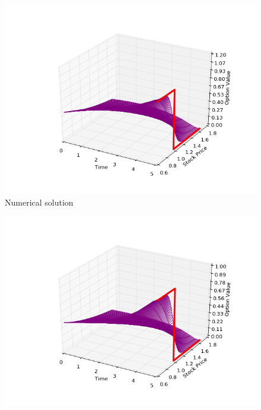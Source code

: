 \documentclass[11pt,a4paper]{extarticle}
\begin{document}
\begin{minipage}{\linewidth}
      \centering
      \begin{minipage}{0.29\linewidth}
          \begin{figure}[H]
              \includegraphics[width=\linewidth]{Figures/c-o-n-put-num}
              \caption{Numerical solution}
          \end{figure}
      \end{minipage}
      \hspace{0.04\linewidth}
      \begin{minipage}{0.29\linewidth}
          \begin{figure}[H]
              \includegraphics[width=\linewidth]{Figures/c-o-n-put-analyt}

\end{figure}
\end{minipage}
\end{minipage}
\end{document}
